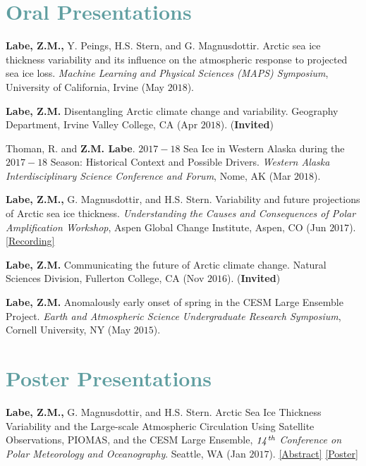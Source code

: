 \documentclass[margin,line,palatino,courier,10pt]{res}
\begin{document}
\begin{resume}
\section{\sc \textcolor{CadetBlue}{\large{Oral Presentations}}}
\begin{etaremune}[leftmargin=0in,topsep=0in,parsep=0in]
\item \textbf{Labe, Z.M.,} Y. Peings, H.S. Stern, and G. Magnusdottir. Arctic sea ice thickness variability and its influence on the atmospheric response to projected sea ice loss. \textit{Machine Learning and Physical Sciences (MAPS) Symposium}, University of California, Irvine (May $2018$). 
\item \textbf{Labe, Z.M.} Disentangling Arctic climate change and variability. Geography Department, Irvine Valley College, CA (Apr $2018$). (\textbf{Invited})
\item Thoman, R. and \textbf{Z.M. Labe}. $2017-18$ Sea Ice in Western Alaska during the $2017-18$ Season: Historical Context and Possible Drivers. \textit{Western Alaska Interdisciplinary Science Conference and Forum}, Nome, AK (Mar $2018$). 
\item \textbf{Labe, Z.M.,} G. Magnusdottir, and H.S. Stern. Variability and future projections of Arctic sea ice thickness. \textit{Understanding the Causes and Consequences of Polar Amplification Workshop}, Aspen Global Change Institute, Aspen, CO (Jun $2017$). \href{https://www.agci.org/lib/17s1/variability-and-future-projections-arctic-sea-ice-thickness}{[Recording]}
\item \textbf{Labe, Z.M.} Communicating the future of Arctic climate change. Natural Sciences Division, Fullerton College, CA (Nov $2016$). (\textbf{Invited})
\item \textbf{Labe, Z.M.} Anomalously early onset of spring in the CESM Large Ensemble Project. \textit{Earth and Atmospheric Science Undergraduate Research Symposium}, Cornell University, NY (May $2015$). 

\end{etaremune}

\section{\sc \textcolor{CadetBlue}{\large{Poster Presentations}}}
\begin{etaremune}[leftmargin=0in,topsep=0in,parsep=0in]
\item \textbf{Labe, Z.M.,} G. Magnusdottir, and H.S. Stern. Arctic Sea Ice Thickness Variability and the Large-scale Atmospheric Circulation Using Satellite Observations, PIOMAS, and the CESM Large Ensemble, \textit{$\it{14^{th}}$ Conference on Polar Meteorology and Oceanography}. Seattle, WA (Jan $2017$). \href{https://ams.confex.com/ams/97Annual/webprogram/Paper313445.html}{[Abstract]} \href{http://sites.uci.edu/zlabe/files/2017/01/ZLabeMagnusdottirStern_AMSposter_2017.pdf}{[Poster]}


\end{etaremune}
\end{resume}
\end{document}
